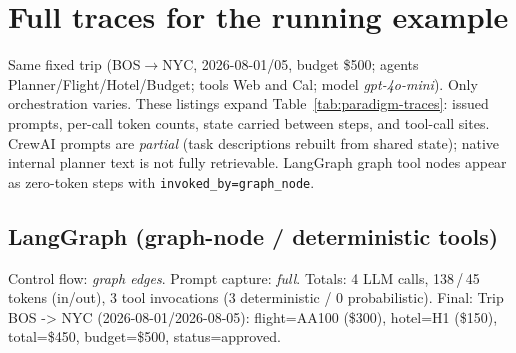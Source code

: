 \section{Full traces for the running example}
\label{app:running-example-traces}

\noindent
Same fixed trip (BOS$\to$NYC, 2026-08-01/05, budget \$500; agents Planner/Flight/Hotel/Budget;
tools Web and Cal; model \emph{gpt-4o-mini}). Only orchestration varies.
These listings expand Table~\ref{tab:paradigm-traces}: issued prompts, per-call token counts,
state carried between steps, and tool-call sites.
CrewAI prompts are \emph{partial} (task descriptions rebuilt from shared state); native
internal planner text is not fully retrievable.
LangGraph graph tool nodes appear as zero-token steps with \texttt{invoked\_by=graph\_node}.

\subsection{LangGraph (graph-node / deterministic tools)}
\label{app:trace-langgraph}
Control flow: \emph{graph edges}. Prompt capture: \emph{full}. Totals: 4 LLM calls, 138\,/\,45 tokens (in/out), 3 tool invocations (3 deterministic / 0 probabilistic). Final: Trip BOS -> NYC (2026-08-01/2026-08-05): flight=AA100 (\$300), hotel=H1 (\$150), total=\$450, budget=\$500, status=approved.

